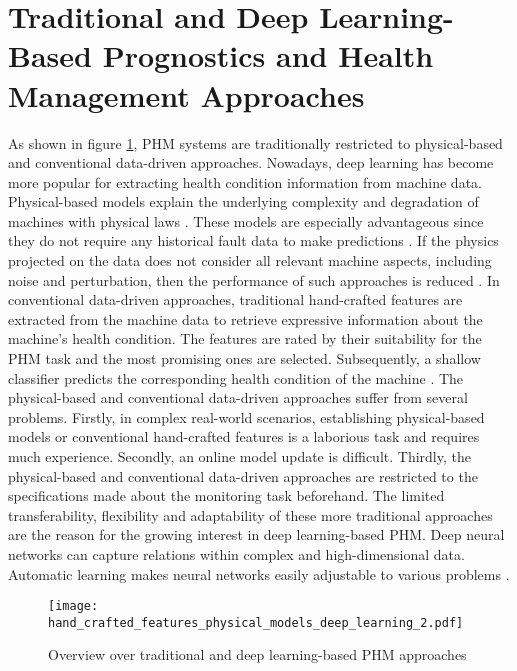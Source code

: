 \section{Traditional and Deep Learning-Based Prognostics and Health Management Approaches}
As shown in figure \ref{fig:hand_crafted_features_physical_models_deep_learning}, PHM systems are traditionally restricted to physical-based and conventional data-driven approaches. Nowadays, deep learning has become more popular for extracting health condition information from machine data. Physical-based models explain the underlying complexity and degradation of machines with physical laws \cite{ZHAO2019213}. These models are especially advantageous since they do not require any historical fault data to make predictions \cite{Benker2019}. If the physics projected on the data does not consider all relevant machine aspects, including noise and perturbation, then the performance of such approaches is reduced \cite{ZHAO2019213}. In conventional data-driven approaches, traditional hand-crafted features are extracted from the machine data to retrieve expressive information about the machine's health condition. The features are rated by their suitability for the PHM task and the most promising ones are selected. Subsequently, a shallow classifier predicts the corresponding health condition of the machine \cite{ZHAO2019213}. The physical-based and conventional data-driven approaches suffer from several problems. Firstly, in complex real-world scenarios, establishing physical-based models or conventional hand-crafted features is a laborious task and requires much experience. Secondly, an online model update is difficult. Thirdly, the physical-based and conventional data-driven approaches are restricted to the specifications made about the monitoring task beforehand. The limited transferability, flexibility and adaptability of these more traditional approaches are the reason for the growing interest in deep learning-based PHM. Deep neural networks can capture relations within complex and high-dimensional data. Automatic learning makes neural networks easily adjustable to various problems \cite{ZHAO2019213}.
\begin{figure}[H]
  \centering
  \texttt{[image: hand\_crafted\_features\_physical\_models\_deep\_learning\_2.pdf]}
  \caption {Overview over traditional and deep learning-based PHM approaches \cite{ZHAO2019213}} \label{fig:hand_crafted_features_physical_models_deep_learning}
\end{figure}

